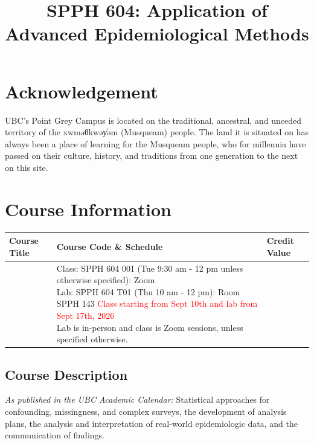 \documentclass[
]{article}
\title{SPPH 604: Application of Advanced Epidemiological Methods}
\author{}
\date{\vspace{-2.5em}}
\begin{document}
\maketitle

\section{Acknowledgement}\label{acknowledgement}

UBC's Point Grey Campus is located on the traditional, ancestral, and
unceded territory of the xwməθkwəy̓əm (Musqueam) people. The land it is
situated on has always been a place of learning for the Musqueam people,
who for millennia have passed on their culture, history, and traditions
from one generation to the next on this site.

\section{Course Information}\label{course-information}

\begin{table}[H]
\centering
\begin{tabular}[t]{>{\raggedright\arraybackslash}p{3cm}>{\raggedright\arraybackslash}p{9cm}>{\raggedright\arraybackslash}p{2cm}}
\toprule
Course Title & Course Code \& Schedule & Credit Value\\
\midrule
\cellcolor{gray!10}{Application of Advanced Epidemiological Methods} & \cellcolor{gray!10}{Class: SPPH 604 001 (Tue 9:30 am - 12 pm unless otherwise specified): Zoom \newline Lab: SPPH 604 T01 (Thu 10 am - 12 pm): Room SPPH 143 \textcolor{red}{Class starting from Sept 10th and lab from Sept 17th, 2026} \newline Lab is in-person and class is Zoom sessions, unless specified otherwise.} & \cellcolor{gray!10}{3}\\
\bottomrule
\end{tabular}
\end{table}

\subsection{Course Description}\label{course-description}

\emph{As published in the UBC Academic Calendar:} Statistical approaches
for confounding, missingness, and complex surveys, the development of
analysis plans, the analysis and interpretation of real-world
epidemiologic data, and the communication of findings.
\end{document}

